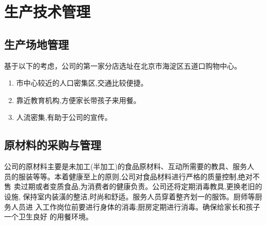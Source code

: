 \section{生产技术管理}

\subsection{生产场地管理}
基于以下的考虑，公司的第一家分店选址在北京市海淀区五道口购物中心。
\begin{enumerate}
                \item 市中心较近的人口密集区,交通比较便捷。
                \item 靠近教育机构,方便家长带孩子来用餐。
                \item 人流密集,有助于公司的宣传。
\end{enumerate}

\subsection{原材料的采购与管理}
公司的原材料主要是未加工(半加工)的食品原材料、互动所需要的教具、服务人
员的服装等等。本着健康至上的原则,公司对食品材料进行严格的质量控制,绝对不售
卖过期或者变质食品,为消费者的健康负责。公司还将定期消毒教具,更换老旧的设施,
保持室内装潢的整洁,时尚和舒适。服务人员穿着整齐划一的服饰。厨师等厨务人员进
入工作岗位前要进行身体的消毒;厨房定期进行消毒。确保给家长和孩子一个卫生良好
的用餐环境。

